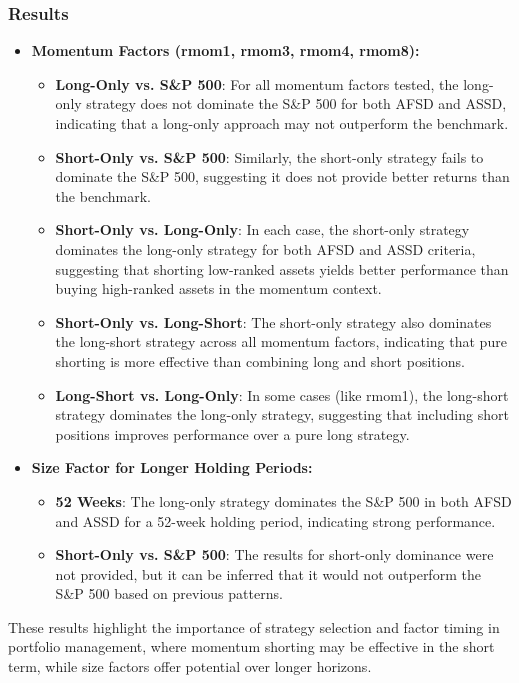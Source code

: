 \documentclass{article}
\begin{document}
\subsubsection{Results}
\begin{itemize}
    \item \textbf{Momentum Factors (rmom1, rmom3, rmom4, rmom8):}
    \begin{itemize}
        \item \textbf{Long-Only vs. S\&P 500}: For all momentum factors tested, the long-only strategy does not dominate the S\&P 500 for both AFSD and ASSD, indicating that a long-only approach may not outperform the benchmark.
        \item \textbf{Short-Only vs. S\&P 500}: Similarly, the short-only strategy fails to dominate the S\&P 500, suggesting it does not provide better returns than the benchmark.
        \item \textbf{Short-Only vs. Long-Only}: In each case, the short-only strategy dominates the long-only strategy for both AFSD and ASSD criteria, suggesting that shorting low-ranked assets yields better performance than buying high-ranked assets in the momentum context.
        \item \textbf{Short-Only vs. Long-Short}: The short-only strategy also dominates the long-short strategy across all momentum factors, indicating that pure shorting is more effective than combining long and short positions.
        \item \textbf{Long-Short vs. Long-Only}: In some cases (like rmom1), the long-short strategy dominates the long-only strategy, suggesting that including short positions improves performance over a pure long strategy.
    \end{itemize}
    \item \textbf{Size Factor for Longer Holding Periods:}
    \begin{itemize}
        \item \textbf{52 Weeks}: The long-only strategy dominates the S\&P 500 in both AFSD and ASSD for a 52-week holding period, indicating strong performance.
        \item \textbf{Short-Only vs. S\&P 500}: The results for short-only dominance were not provided, but it can be inferred that it would not outperform the S\&P 500 based on previous patterns.
    \end{itemize}
\end{itemize}

These results highlight the importance of strategy selection and factor timing in portfolio management, where momentum shorting may be effective in the short term, while size factors offer potential over longer horizons.
\end{document}
